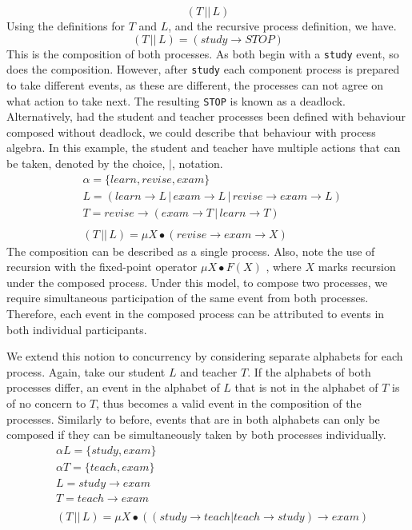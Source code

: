 \[
(T \,||\, L)    
\]
Using the definitions for $T$ and $L$, and the recursive process definition, we have.
\[
(T \,||\, L) = (study \rightarrow STOP)    
\]
This is the composition of both processes. As both begin with a \texttt{study} event, so does the composition. However, after \texttt{study} each component process is prepared to take different events, as these are different, the processes can not agree on what action to take next. The resulting \texttt{STOP} is known as a deadlock. Alternatively, had the student and teacher processes been defined with behaviour composed without deadlock, we could describe that behaviour with process algebra. In this example, the student and teacher have multiple actions that can be taken, denoted by the choice, $|$, notation.
\[
\begin{aligned}
& \alpha = \{learn, revise, exam\} \\
& L = (learn \rightarrow L \,|\, exam \rightarrow L \,|\, revise \rightarrow exam \rightarrow L) \\
& T = revise \rightarrow (exam \rightarrow T \,|\, learn \rightarrow T) \\
& \\ 
& (T \,||\, L) = \mu X \bullet (revise \rightarrow exam \rightarrow X)
\end{aligned}
\]
The composition can be described as a single process. Also, note the use of recursion with the fixed-point operator $\mu X \bullet F(X)$ \cite[p.74]{csp_paper}, where $X$ marks recursion under the composed process. Under this model, to compose two processes, we require simultaneous participation of the same event from both processes. Therefore, each event in the composed process can be attributed to events in both individual participants.
\par
We extend this notion to concurrency by considering separate alphabets for each process. Again, take our student $L$ and teacher $T$. If the alphabets of both processes differ, an event in the alphabet of $L$ that is not in the alphabet of $T$ is of no concern to $T$, thus becomes a valid event in the composition of the processes. Similarly to before, events that are in both alphabets can only be composed if they can be simultaneously taken by both processes individually.
\[
\begin{aligned}
& \alpha L = \{study, exam\} \\
& \alpha T = \{teach, exam\} \\
& L = study \rightarrow exam \\
& T = teach \rightarrow exam \\
& \\ 
& (T \,||\, L) = \mu X \bullet ((study \rightarrow teach | teach \rightarrow study) \rightarrow exam)
\end{aligned}
\]
